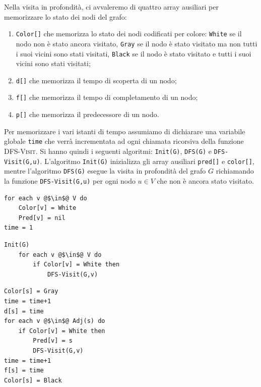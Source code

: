 Nella visita in profondità, ci avvaleremo di quattro array ausiliari per memorizzare lo stato dei nodi del grafo:
\begin{enumerate}
	\item \texttt{Color[]} che memorizza lo stato dei nodi codificati per colore: \texttt{White} se il nodo non è stato ancora visitato, \texttt{Gray} se il nodo è stato visitato ma non tutti i suoi vicini sono stati visitati, \texttt{Black} se il nodo è stato visitato e tutti i suoi vicini sono stati visitati;
	\item \texttt{d[]} che memorizza il tempo di scoperta di un nodo;
	\item \texttt{f[]} che memorizza il tempo di completamento di un nodo;
	\item \texttt{p[]} che memorizza il predecessore di un nodo.
\end{enumerate}
Per memorizzare i vari istanti di tempo assumiamo di dichiarare una variabile globale \texttt{time} che verrà incrementata ad ogni chiamata ricorsiva della funzione \textsc{DFS-Visit}. Si hanno quindi i seguenti algoritmi: \texttt{Init(G)}, \texttt{DFS(G)} e \texttt{DFS-Visit(G,u)}. L'algoritmo \texttt{Init(G)} inizializza gli array ausiliari \texttt{pred[]} e \texttt{color[]}, mentre l'algoritmo \texttt{DFS(G)} esegue la visita in profondità del grafo $G$ richiamando la funzione \texttt{DFS-Visit(G,u)} per ogni nodo $u \in V$ che non è ancora stato visitato.
\begin{center}
\begin{minipage}{,4\textwidth}
\begin{lstlisting}[language=asd,caption={Init(G)},label=lst:init_graph]
for each v @$\in$@ V do
	Color[v] = White
	Pred[v] = nil
time = 1
\end{lstlisting}
\end{minipage}
\begin{minipage}{0.4\textwidth}
	\begin{lstlisting}[language=asd,caption={DFS(G)},label=lst:dfs_graph]
	Init(G)
	for each v @$\in$@ V do
		if Color[v] = White then
			DFS-Visit(G,v)
	\end{lstlisting}
\end{minipage}
\end{center}
\begin{lstlisting}[language=asd,caption={DFS-Visit(G,s)},label=lst:dfs_visit_graph]
Color[s] = Gray
time = time+1
d[s] = time
for each v @$\in$@ Adj(s) do
	if Color[v] = White then
		Pred[v] = s
		DFS-Visit(G,v)
time = time+1
f[s] = time
Color[s] = Black
\end{lstlisting}


